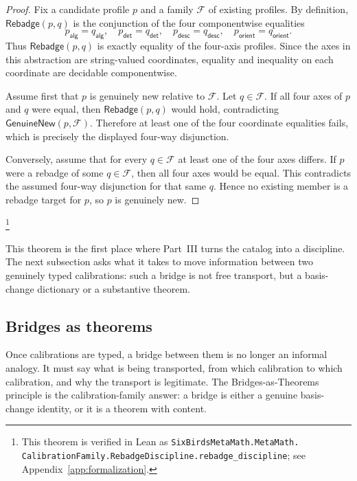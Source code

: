 \documentclass[11pt]{article}
\theoremstyle{definition}
\begin{document}
\begin{proof}
Fix a candidate profile \(p\) and a family \(\mathcal F\) of existing
profiles.  By definition,
\(\mathsf{Rebadge}(p,q)\) is the conjunction of the four componentwise
equalities
\[
  p_{\mathsf{alg}}=q_{\mathsf{alg}},\quad
  p_{\mathsf{det}}=q_{\mathsf{det}},\quad
  p_{\mathsf{desc}}=q_{\mathsf{desc}},\quad
  p_{\mathsf{orient}}=q_{\mathsf{orient}}.
\]
Thus \(\mathsf{Rebadge}(p,q)\) is exactly equality of the four-axis
profiles.  Since the axes in this abstraction are string-valued
coordinates, equality and inequality on each coordinate are decidable
componentwise.

Assume first that \(p\) is genuinely new relative to \(\mathcal F\).
Let \(q\in\mathcal F\).  If all four axes of \(p\) and \(q\) were
equal, then \(\mathsf{Rebadge}(p,q)\) would hold, contradicting
\(\mathsf{GenuineNew}(p,\mathcal F)\).  Therefore at least one of the
four coordinate equalities fails, which is precisely the displayed
four-way disjunction.

Conversely, assume that for every \(q\in\mathcal F\) at least one of
the four axes differs.  If \(p\) were a rebadge of some \(q\in\mathcal F\),
then all four axes would be equal.  This contradicts the assumed
four-way disjunction for that same \(q\).  Hence no existing member is
a rebadge target for \(p\), so \(p\) is genuinely new.
\end{proof}\footnote{\raggedright This theorem is verified in Lean as
\texttt{SixBirdsMetaMath.MetaMath.\allowbreak
CalibrationFamily.RebadgeDiscipline.\allowbreak rebadge\_discipline};
see Appendix~\ref{app:formalization}.}

This theorem is the first place where Part~III turns the catalog into a
discipline.  The next subsection asks what it takes to move information
between two genuinely typed calibrations: such a bridge is not free
transport, but a basis-change dictionary or a substantive theorem.

\subsection{Bridges as theorems}\label{sec:calibration:bridges-as-theorems}

Once calibrations are typed, a bridge between them is no longer an
informal analogy.  It must say what is being transported, from which
calibration to which calibration, and why the transport is legitimate.
The Bridges-as-Theorems principle is the calibration-family answer: a
bridge is either a genuine basis-change identity, or it is a theorem with
content.
\end{document}
